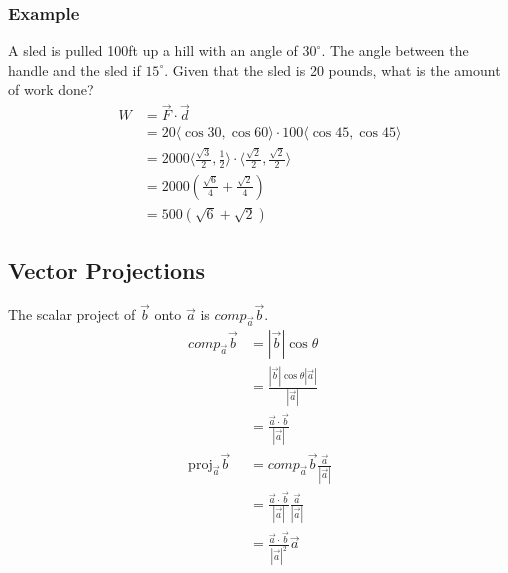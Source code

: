 \documentclass{math}
\begin{document}
\subsubsection*{Example}
A sled is pulled 100ft up a hill with an angle of \( 30^{\circ} \). The angle
between the handle and the sled if \( 15^{\circ} \). Given that the sled is 20
pounds, what is the amount of work done?
\begin{align*}
  W &= \vec{F}\cdot\vec{d} \\
  &= 20\langle\cos30,\cos60\rangle\cdot100\langle\cos45,\cos45\rangle \\
  &= 2000\langle\frac{\sqrt{3}}{2},\frac{1}{2}\rangle
    \cdot\langle\frac{\sqrt{2}}{2},\frac{\sqrt{2}}{2}\rangle \\
  &= 2000(\frac{\sqrt{6}}{4}+\frac{\sqrt{2}}{4}) \\
  &= 500(\sqrt{6}+\sqrt{2})
\end{align*}

\subsection*{Vector Projections}
\begin{center}
\end{center}
The scalar project of \( \vec{b} \) onto \( \vec{a} \) is
\( comp_{\vec{a}}\vec{b} \).
\begin{align*}
  comp_{\vec{a}}\vec{b} &= |\vec{b}|\cos\theta \\
  &= \frac{|\vec{b}|\cos\theta|\vec{a}|}{|\vec{a}|} \\
  &= \frac{\vec{a}\cdot\vec{b}}{|\vec{a}|} \\
  \text{proj}_{\vec{a}}\vec{b} &=
    comp_{\vec{a}}\vec{b}\frac{\vec{a}}{|\vec{a}|} \\
  &= \frac{\vec{a}\cdot\vec{b}}{|\vec{a}|}\frac{\vec{a}}{|\vec{a}|} \\
  &= \frac{\vec{a}\cdot\vec{b}}{|\vec{a}|^{2}}\vec{a}
\end{align*}
\end{document}
